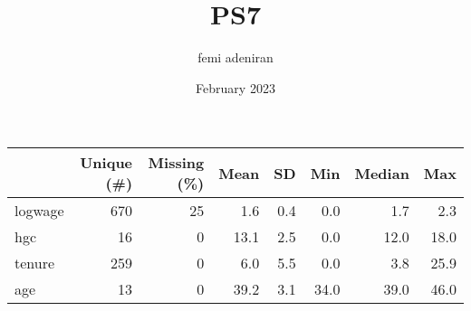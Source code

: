 \documentclass{article}
\title{PS7}
\author{femi adeniran}
\date{February 2023}
\begin{document}
\maketitle
\begin{table}
\centering
\begin{tabular}[t]{lrrrrrrr}
\toprule
  & Unique (\#) & Missing (\%) & Mean & SD & Min & Median & Max\\
\midrule
logwage & 670 & 25 & \num{1.6} & \num{0.4} & \num{0.0} & \num{1.7} & \num{2.3}\\
hgc & 16 & 0 & \num{13.1} & \num{2.5} & \num{0.0} & \num{12.0} & \num{18.0}\\
tenure & 259 & 0 & \num{6.0} & \num{5.5} & \num{0.0} & \num{3.8} & \num{25.9}\\
age & 13 & 0 & \num{39.2} & \num{3.1} & \num{34.0} & \num{39.0} & \num{46.0}\\
\bottomrule
\end{tabular}
\end{table}
\end{document}
